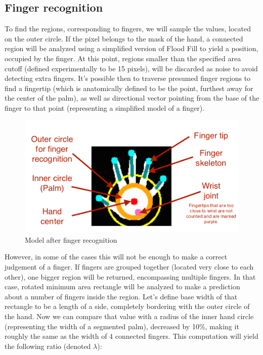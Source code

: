 \documentclass[a4paper,11pt,oneside]{article}
\begin{document}
\subsection{Finger recognition}

To find the regions, corresponding to fingers, we will sample the values, located on the outer circle. If the pixel belongs to the mask of the hand, a connected region will be analyzed using a simplified version of Flood Fill to yield a position, occupied by the finger. At this point, regions smaller than the specified area cutoff (defined experimentally to be 15 pixels), will be discarded as noise to avoid detecting extra fingers. It's possible then to traverse presumed finger regions to find a fingertip (which is anatomically defined to be the point, furthest away for the center of the palm), as well as directional vector pointing from the base of the finger to that point (representing a simplified model of a finger).\\

\begin{figure}[H]
\centering
\includegraphics[scale=1.4]{hand-recognized.png}
\caption{Model after finger recognition}
\end{figure}

However, in some of the cases this will not be enough to make a correct judgement of a finger. If fingers are grouped together (located very close to each other), one bigger region will be returned, encompassing multiple fingers. In that case, rotated minimum area rectangle will be analyzed to make a prediction about a number of fingers inside the region. Let's define base width of that rectangle to be a length of a side, completely bordering with the outer circle of the hand. Now we can compare that value with a radius of the inner hand circle (representing the width of a segmented palm), decreased by 10\%, making it roughly the same as the width of 4 connected fingers. This computation will yield the following ratio (denoted $\lambda$):
\end{document}
